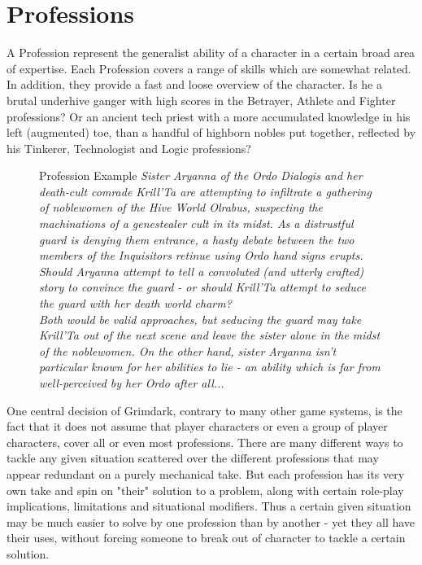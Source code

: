 \section{Professions} %
\label{sec:professions}
A Profession represent the generalist ability of a character in a certain broad area of expertise.
Each Profession covers a range of skills which are somewhat related.
In addition, they provide a fast and loose overview of the character.
Is he a brutal underhive ganger with high scores in the Betrayer, Athlete and Fighter professions?
Or an ancient tech priest with a more accumulated knowledge in his left (augmented) toe, than a handful of highborn nobles put together, reflected by his  Tinkerer, Technologist and Logic professions?
\begin{figure}[ht]
	\begin{DndSidebar}{Profession Example}
	\textit{Sister Aryanna of the Ordo Dialogis and her death-cult comrade Krill'Ta are attempting to infiltrate a gathering of noblewomen of the Hive World Olrabus, suspecting the machinations of a genestealer cult in its midst. As a distrustful guard is denying them entrance, a hasty debate between the two members of the Inquisitors retinue using Ordo hand signs erupts. Should Aryanna attempt to tell a convoluted (and utterly crafted) story to convince the guard - or should Krill'Ta attempt to seduce the guard with her death world charm?\\
	Both would be valid approaches, but seducing the guard may take Krill'Ta out of the next scene and leave the sister alone in the midst of the noblewomen. On the other hand, sister Aryanna isn't particular known for her abilities to lie - an ability which is far from well-perceived by her Ordo after all...\\}
	\end{DndSidebar}
\end{figure}

One central decision of Grimdark, contrary to many other game systems, is the fact that it does not assume that player characters or even a group of player characters, cover all or even most professions. 
There are many different ways to tackle any given situation scattered over the different professions that may appear redundant on a purely mechanical take.
But each profession has its very own take and spin on "their" solution to a problem, along with certain role-play implications, limitations and situational modifiers.
Thus a certain given situation may be much easier to solve by one profession than by another - yet they all have their uses, without forcing someone to break out of character to tackle a certain solution.

